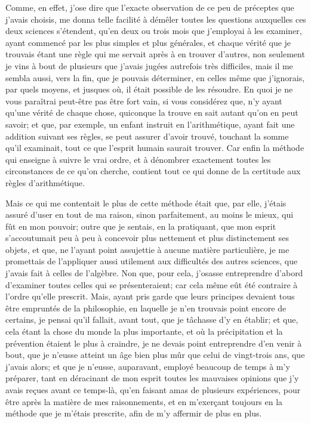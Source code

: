 \documentclass[french,twoside]{book} %
\newcommand\chapterclose{} %
\begin{document}
Comme, en effet, j'ose dire que l'exacte observation de ce peu de préceptes que j'avais choisis, me donna telle facilité à démêler toutes les questions auxquelles ces deux sciences s'étendent, qu'en deux ou trois mois que j'employai à les examiner, ayant commencé par les plus simples et plus générales, et chaque vérité que je trouvais étant une règle qui me servait après à en trouver d'autres, non seulement je vins à bout de plusieurs que j'avais jugées autrefois très difficiles, mais il me sembla aussi, vers la fin, que je pouvais déterminer, en celles même que j'ignorais, par quels moyens, et jusques où, il était possible de les résoudre. En quoi je ne vous paraîtrai peut-être pas être fort vain, si vous considérez que, n'y ayant qu'une vérité de chaque chose, quiconque la trouve en sait autant qu'on en peut savoir; et que, par exemple, un enfant instruit en l'arithmétique, ayant fait une addition suivant ses règles, se peut assurer d'avoir trouvé, touchant la somme qu'il examinait, tout ce que l'esprit humain saurait trouver. Car enfin la méthode qui enseigne à suivre le vrai ordre, et à dénombrer exactement toutes les circonstances de ce qu'on cherche, contient tout ce qui donne de la certitude aux règles d'arithmétique.\par
Mais ce qui me contentait le plus de cette méthode était que, par elle, j'étais assuré d'user en tout de ma raison, sinon parfaitement, au moins le mieux, qui fût en mon pouvoir; outre que je sentais, en la pratiquant, que mon esprit s'accoutumait peu à peu à concevoir plus nettement et plus distinctement ses objets, et que, ne l'ayant point assujettie à aucune matière particulière, je me promettais de l'appliquer aussi utilement aux difficultés des autres sciences, que j'avais fait à celles de l'algèbre. Non que, pour cela, j'osasse entreprendre d'abord d'examiner toutes celles qui se présenteraient; car cela même eût été contraire à l'ordre qu'elle prescrit. Mais, ayant pris garde que leurs principes devaient tous être empruntés de la philosophie, en laquelle je n'en trouvais point encore de certains, je pensai qu'il fallait, avant tout, que je tâchasse d'y en établir; et que, cela étant la chose du monde la plus importante, et où la précipitation et la prévention étaient le plus à craindre, je ne devais point entreprendre d'en venir à bout, que je n'eusse atteint un âge bien plus mûr que celui de vingt-trois ans, que j'avais alors; et que je n'eusse, auparavant, employé beaucoup de temps à m'y préparer, tant en déracinant de mon esprit toutes les mauvaises opinions que j'y avais reçues avant ce temps-là, qu'en faisant amas de plusieurs expériences, pour être après la matière de mes raisonnements, et en m'exerçant toujours en la méthode que je m'étais prescrite, afin de m'y affermir de plus en plus.
\chapterclose
\end{document}
